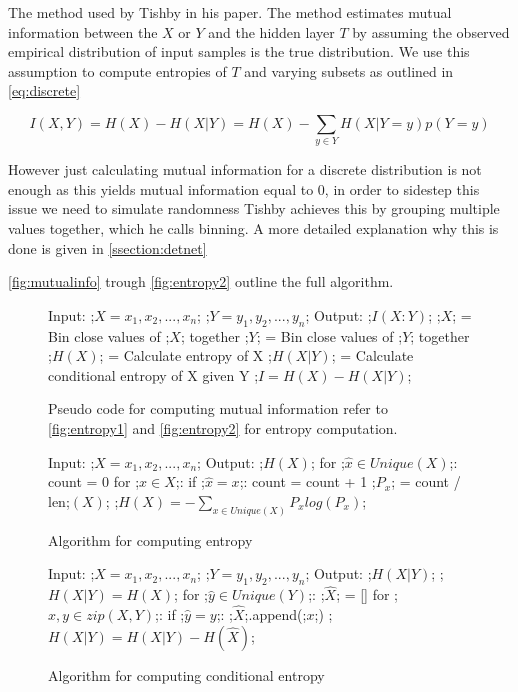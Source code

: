   The method used by Tishby in his paper. The method estimates mutual
  information between the $X$ or $Y$ and the hidden layer $T$ by assuming the
  observed empirical distribution of input samples is the true distribution. We
  use this assumption to compute entropies of $T$ and varying subsets as
  outlined in \autoref{eq:discrete}

\begin{equation}
  I(X, Y) = H(X) - H(X|Y) = H(X) - \sum _{y\in Y} H(X|Y = y)p(Y = y)
\end{equation} \label{eq:discrete}


  However just calculating mutual information for a discrete distribution is not
  enough as this yields mutual information equal to 0, in order to sidestep this
  issue we need to simulate randomness Tishby achieves this by grouping multiple
  values together, which he calls binning. A more detailed explanation why this
  is done is given in \autoref{ssection:detnet}

   \autoref{fig:mutualinfo} trough \autoref{fig:entropy2} outline the full
   algorithm.
\begin{figure}[H]
    \begin{pythonfigure}
      Input: 
      ;$X = x_1, x_2,...,x_n$;
      ;$Y = y_1, y_2,...,y_n$;
      Output: ;$I(X:Y)$;
      ;$X$; = Bin close values of ;$X$; together
      ;$Y$; = Bin close values of ;$Y$; together
      ;$H(X)$; = Calculate entropy of X
      ;$H(X|Y)$; = Calculate conditional entropy of X given Y
      ;$I = H(X) - H(X|Y)$;
    \end{pythonfigure}
    \caption{Pseudo code for computing mutual information refer to
    \autoref{fig:entropy1} and \autoref{fig:entropy2} for entropy computation.}
    \label{fig:mutualinfo}
\end{figure}

\begin{figure}[H]
    \begin{pythonfigure}
      Input: ;$X = x_1, x_2,...,x_n$;
      Output: ;$H(X)$;
      for ;$ \hat{x}\in Unique(X)$;:
        count = 0       
        for ;$x \in X$;:
          if ;$\hat{x} = x$;:
            count = count + 1
        ;$P_x$; = count / len;$(X)$;
      ;$H(X) = - \sum _{x\in Unique(X)} P_x log(P_x)$; 
    \end{pythonfigure}
    \caption{Algorithm for computing entropy}
    \label{fig:entropy1}
\end{figure} 

\begin{figure}[H]
    \begin{pythonfigure}
      Input: 
      ;$X = x_1, x_2,...,x_n$;
      ;$Y = y_1, y_2,...,y_n$;
      Output: ;$H(X|Y)$;
      ;$H(X|Y) = H(X)$;
      for ;$ \hat{y}\in Unique(Y)$;:
        ;$\hat{X}$; = []
        for ;$x, y \in zip(X, Y)$;:
          if ;$\hat{y} = y$;:
            ;$\hat{X}$;.append(;$x$;)
          ;$H(X|Y) = H(X|Y) - H(\hat{X})$;
    \end{pythonfigure}
    \caption{Algorithm for computing conditional entropy}
    \label{fig:entropy2}
\end{figure}


